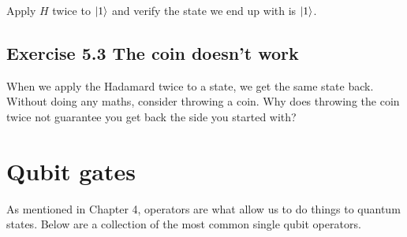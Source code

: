 \documentclass{book}
\begin{document}
Apply $H$ twice to $\ket{1}$ and verify the state we end up with is $\ket{1}$. 

\subsection{Exercise 5.3 The coin doesn't work}

When we apply the Hadamard twice to a state, we get the same state back. Without doing any maths, consider throwing a coin. Why does throwing the coin twice not guarantee you get back the side you started with? 

\vspace{5mm} %

\hline \section{Qubit gates }

As mentioned in Chapter 4, operators are what allow us to do things to quantum states. Below are a collection of the most common single qubit operators. 
\end{document}
